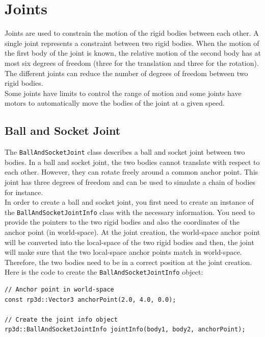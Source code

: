 \documentclass[a4paper,12pt]{article}
\begin{document}
    \section{Joints}

    Joints are used to constrain the motion of the rigid bodies between each other. A single joint represents a constraint between two rigid bodies.
    When the motion of the first body of the joint is known, the relative motion of the second body has at most six degrees of freedom (three for the
    translation and three for the rotation). The different joints can reduce the number of degrees of freedom between two rigid bodies. \\

    Some joints have limits to control the range of motion and some joints have motors to automatically move the bodies of the joint at a given speed. \\

    \subsection{Ball and Socket Joint}

    The \texttt{BallAndSocketJoint} class describes a ball and socket joint between two bodies. In a ball and socket joint, the two bodies cannot translate with respect to each other.
    However, they can rotate freely around a common anchor point. This joint has three degrees of freedom and can be used to simulate a chain of bodies for instance. \\

    In order to create a ball and socket joint, you first need to create an instance of the \texttt{BallAndSocketJointInfo} class with the necessary information. You need to provide the pointers to the
    two rigid bodies and also the coordinates of the anchor point (in world-space). At the joint creation, the world-space anchor point will be converted into the local-space of the two rigid
    bodies and then, the joint will make sure that the two local-space anchor points match in world-space. Therefore, the two bodies need to be in a correct position at the joint creation. \\

    Here is the code to create the \texttt{BallAndSocketJointInfo} object: \\

    \begin{lstlisting}
// Anchor point in world-space
const rp3d::Vector3 anchorPoint(2.0, 4.0, 0.0);

// Create the joint info object
rp3d::BallAndSocketJointInfo jointInfo(body1, body2, anchorPoint);
  \end{lstlisting}
\end{document}
